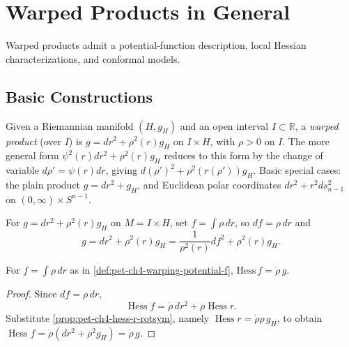 \section{Warped Products in General}

Warped products admit a potential-function description, local Hessian
characterizations, and conformal models.

\subsection{Basic Constructions}

\begin{definition}
  \label{def:pet-ch4-warped-product-general}


  Given a Riemannian manifold $(H,g_H)$ and an open interval $I\subset\mathbb{R}$, a
  \emph{warped product} (over $I$) is $g=dr^2+\rho^2(r)g_H$ on $I\times H$, with
  $\rho>0$ on $I$. The more general form $\psi^2(r)dr^2+\rho^2(r)g_H$ reduces to
  this form by the change of variable $d\rho'=\psi(r)dr$, giving
  $d(\rho')^2+\rho^2(r(\rho'))g_H$. Basic special cases: the plain product
  $g=dr^2+g_H$, and Euclidean polar coordinates $dr^2+r^2ds_{n-1}^2$ on
  $(0,\infty)\times S^{n-1}$.
\end{definition}

\begin{definition}
  \label{def:pet-ch4-warping-potential-f}


  For $g=dr^2+\rho^2(r)g_H$ on $M=I\times H$, set $f=\int\rho\,dr$, so $df=\rho\,dr$
  and
  \[
    g=dr^2+\rho^2(r)g_H=\frac1{\rho^2(r)}df^2+\rho^2(r)g_H.
  \]
\end{definition}

\begin{proposition}
  \label{prop:pet-ch4-hess-f-conformal}

  For $f=\int\rho\,dr$ as in \cref{def:pet-ch4-warping-potential-f},
  $\mathrm{Hess}\,f=\dot\rho\,g$.
\end{proposition}
\begin{proof}
  \sketch
  Since $df=\rho\,dr$,
  \[
    \operatorname{Hess}f=\dot\rho\,dr^2+\rho\operatorname{Hess}r.
  \]
  Substitute \cref{prop:pet-ch4-hess-r-rotsym}, namely
  $\operatorname{Hess}r=\dot\rho\rho\,g_H$, to obtain
  $\operatorname{Hess}f=\dot\rho(dr^2+\rho^2g_H)=\dot\rho\,g$.
\end{proof}


